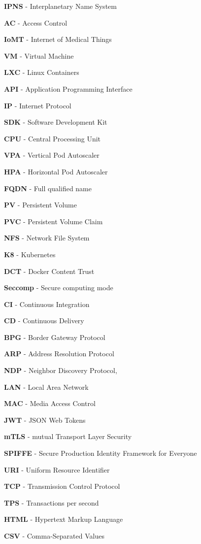 \textbf{IPNS} - Interplanetary Name System

\textbf{AC} - Access Control

\textbf{IoMT} - Internet of Medical Things

\textbf{VM} - Virtual Machine

\textbf{LXC} - Linux Containers

\textbf{API} - Application Programming Interface

\textbf{IP} - Internet Protocol

\textbf{SDK} - Software Development Kit

\textbf{CPU} - Central Processing Unit

\textbf{VPA} - Vertical Pod Autoscaler

\textbf{HPA} - Horizontal Pod Autoscaler

\textbf{FQDN} - Full qualified name

\textbf{PV} - Persistent Volume

\textbf{PVC} - Persistent Volume Claim

\textbf{NFS} - Network File System

\textbf{K8} - Kubernetes

\textbf{DCT} - Docker Content Trust

\textbf{Seccomp} - Secure computing mode

\textbf{CI} - Continuous Integration

\textbf{CD} - Continuous Delivery

\textbf{BPG} - Border Gateway Protocol

\textbf{ARP} - Address Resolution Protocol

\textbf{NDP} - Neighbor Discovery Protocol,

\textbf{LAN} - Local Area Network

\textbf{MAC} - Media Access Control

\textbf{JWT} - JSON Web Tokens

\textbf{mTLS} - mutual Transport Layer Security

\textbf{SPIFFE} - Secure Production Identity Framework for Everyone

\textbf{URI} - Uniform Resource Identifier

\textbf{TCP} - Transmission Control Protocol

\textbf{TPS} - Transactions per second

\textbf{HTML} - Hypertext Markup Language

\textbf{CSV} - Comma-Separated Values

